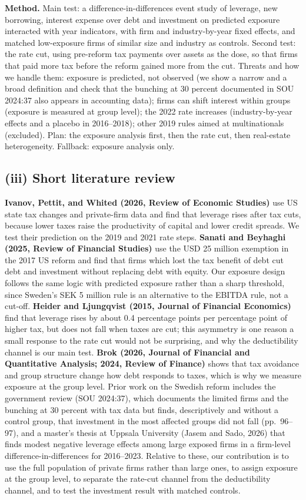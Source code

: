 \documentclass[12pt,a4paper]{article}
\begin{document}
\textbf{Method.} Main test: a difference-in-differences event study of leverage, new borrowing, interest expense over debt and investment on predicted exposure interacted with year indicators, with firm and industry-by-year fixed effects, and matched low-exposure firms of similar size and industry as controls. Second test: the rate cut, using pre-reform tax payments over assets as the dose, so that firms that paid more tax before the reform gained more from the cut. Threats and how we handle them: exposure is predicted, not observed (we show a narrow and a broad definition and check that the bunching at 30 percent documented in SOU 2024:37 also appears in accounting data); firms can shift interest within groups (exposure is measured at group level); the 2022 rate increases (industry-by-year effects and a placebo in 2016--2018); other 2019 rules aimed at multinationals (excluded). Plan: the exposure analysis first, then the rate cut, then real-estate heterogeneity. Fallback: exposure analysis only.

\subsection{(iii) Short literature review}

\textbf{Ivanov, Pettit, and Whited (2026, Review of Economic Studies)} use US state tax changes and private-firm data and find that leverage rises after tax cuts, because lower taxes raise the productivity of capital and lower credit spreads. We test their prediction on the 2019 and 2021 rate steps. \textbf{Sanati and Beyhaghi (2025, Review of Financial Studies)} use the USD 25 million exemption in the 2017 US reform and find that firms which lost the tax benefit of debt cut debt and investment without replacing debt with equity. Our exposure design follows the same logic with predicted exposure rather than a sharp threshold, since Sweden's SEK 5 million rule is an alternative to the EBITDA rule, not a cut-off. \textbf{Heider and Ljungqvist (2015, Journal of Financial Economics)} find that leverage rises by about 0.4 percentage points per percentage point of higher tax, but does not fall when taxes are cut; this asymmetry is one reason a small response to the rate cut would not be surprising, and why the deductibility channel is our main test. \textbf{Brok (2026, Journal of Financial and Quantitative Analysis; 2024, Review of Finance)} shows that tax avoidance and group structure change how debt responds to taxes, which is why we measure exposure at the group level. Prior work on the Swedish reform includes the government review (SOU 2024:37), which documents the limited firms and the bunching at 30 percent with tax data but finds, descriptively and without a control group, that investment in the most affected groups did not fall (pp.~96--97), and a master's thesis at Uppsala University (Jasem and Sado, 2026) that finds modest negative leverage effects among large exposed firms in a firm-level difference-in-differences for 2016--2023. Relative to these, our contribution is to use the full population of private firms rather than large ones, to assign exposure at the group level, to separate the rate-cut channel from the deductibility channel, and to test the investment result with matched controls.
\end{document}
